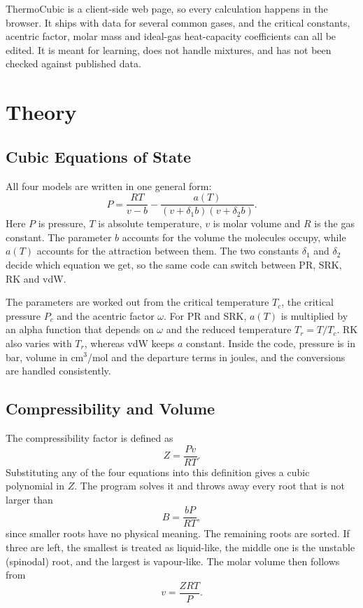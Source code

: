 \documentclass[11pt,a4paper]{article}
\begin{document}
ThermoCubic is a client-side web page, so every calculation happens in the browser. It ships with data for several common gases, and the critical constants, acentric factor, molar mass and ideal-gas heat-capacity coefficients can all be edited. It is meant for learning, does not handle mixtures, and has not been checked against published data.

\section{Theory}

\subsection{Cubic Equations of State}

All four models are written in one general form:
\begin{equation}
P = \frac{RT}{v-b} - \frac{a(T)}{(v+\delta_1 b)(v+\delta_2 b)} .
\label{eq:eos}
\end{equation}
Here $P$ is pressure, $T$ is absolute temperature, $v$ is molar volume and $R$ is the gas constant. The parameter $b$ accounts for the volume the molecules occupy, while $a(T)$ accounts for the attraction between them. The two constants $\delta_1$ and $\delta_2$ decide which equation we get, so the same code can switch between PR, SRK, RK and vdW.

The parameters are worked out from the critical temperature $T_c$, the critical pressure $P_c$ and the acentric factor $\omega$. For PR and SRK, $a(T)$ is multiplied by an alpha function that depends on $\omega$ and the reduced temperature $T_r = T/T_c$. RK also varies with $T_r$, whereas vdW keeps $a$ constant. Inside the code, pressure is in bar, volume in cm$^3$/mol and the departure terms in joules, and the conversions are handled consistently.

\subsection{Compressibility and Volume}

The compressibility factor is defined as
\begin{equation}
Z = \frac{Pv}{RT}.
\label{eq:Z}
\end{equation}
Substituting any of the four equations into this definition gives a cubic polynomial in $Z$. The program solves it and throws away every root that is not larger than
\begin{equation}
B = \frac{bP}{RT},
\label{eq:B}
\end{equation}
since smaller roots have no physical meaning. The remaining roots are sorted. If three are left, the smallest is treated as liquid-like, the middle one is the unstable (spinodal) root, and the largest is vapour-like. The molar volume then follows from
\begin{equation}
v = \frac{ZRT}{P}.
\label{eq:v}
\end{equation}
\end{document}

